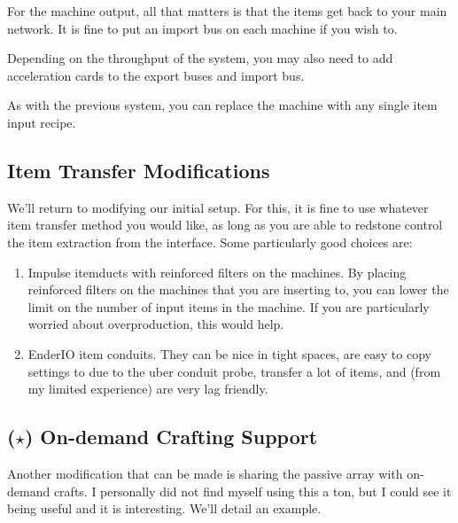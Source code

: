 \documentclass{notes}
\begin{document}
For the machine output, all that matters is that the items get back to your main network. It is fine to put an import bus on each machine if you wish to. 

Depending on the throughput of the system, you may also need to add acceleration cards to the export buses and import bus.

As with the previous system, you can replace the machine with any single item input recipe.

\subsection{Item Transfer Modifications}
We'll return to modifying our initial setup. For this, it is fine to use whatever item transfer method you would like, as long as you are able to redstone control the item extraction from the interface. Some particularly good choices are:
\begin{enumerate}
    \item Impulse itemducts with reinforced filters on the machines. By placing reinforced filters on the machines that you are inserting to, you can lower the limit on the number of input items in the machine. If you are particularly worried about overproduction, this would help. 
    \item EnderIO item conduits. They can be nice in tight spaces, are easy to copy settings to due to the uber conduit probe, transfer a lot of items, and (from my limited experience) are very lag friendly. 
\end{enumerate}

\subsection{($\star$) On-demand Crafting Support}
Another modification that can be made is sharing the passive array with on-demand crafts. I personally did not find myself using this a ton, but I could see it being useful and it is interesting. We'll detail an example.
\end{document}
